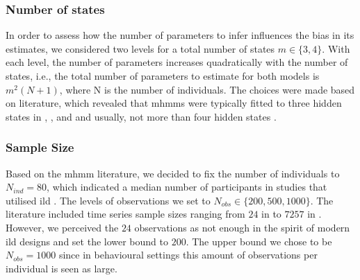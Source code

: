 \subsubsection*{Number of states}
In order to assess how the number of parameters to infer influences the bias in its estimates, we considered two levels for a total number of states ${m \in \{3,4\}}$. With each level, the number of parameters increases quadratically with the number of states, i.e., the total number of parameters to estimate for both models is $m^2(N+1)$, where N is the number of individuals. The choices were made based on literature, which revealed that \ac{mhmm}s were typically fitted to three hidden states in \cite{maruotti_multilevel_2022}, \cite{Long_Tang_Wang_Jiang_2019}, \cite{de_haan_rietdijk_use_2017} and \cite{shirley_hidden_2010} and usually, not more than four hidden states \citep[see][]{Schafer_Wikle_VonBank_Ballard_Weegman_2020,inaba_mixed_2017}. 
\subsubsection*{Sample Size}
Based on the \ac{mhmm} literature, we decided to fix the number of individuals to ${N_{ind}=80}$, which indicated a median number of participants in studies that utilised \ac{ild} \citep[][]{altman_mixed_2007,Schliehe_Diecks_Kappeler_Langrock_2012,Schafer_Wikle_VonBank_Ballard_Weegman_2020, de_haan_rietdijk_use_2017,inaba_mixed_2017}. The levels of observations we set to ${N_{obs}\in \{200, 500, 1000\}}$. The literature included time series sample sizes ranging from $24$ in \cite{altman_mixed_2007} to $7257$ in \cite{inaba_mixed_2017}. However, we perceived the $24$ observations as not enough in the spirit of modern \ac{ild} designs and set the lower bound to $200$. The upper bound we chose to be ${N_{obs}=1000}$ since in behavioural settings this amount of observations per individual is seen as large.
